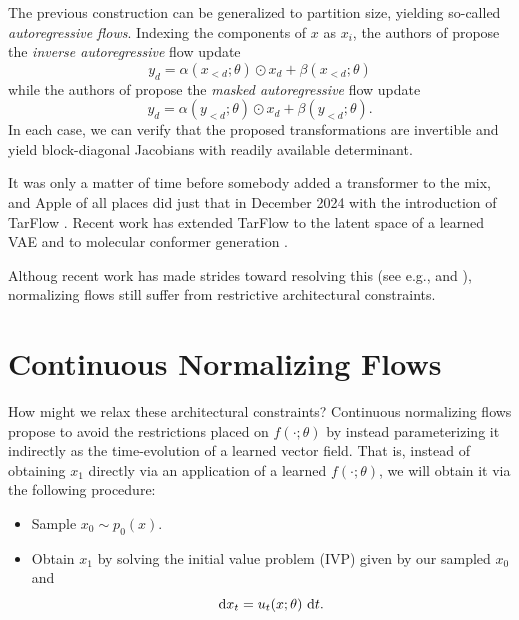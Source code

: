 \documentclass{scrartcl}
\begin{document}
\begin{examplebox}
    The previous construction can be generalized to partition size, yielding so-called \textit{autoregressive flows}. Indexing the components of $x$ as $x_i$, the authors of \citep{iaf}
    propose the \textit{inverse autoregressive} flow update
    \begin{equation}
    y_{d} = \alpha(x_{<d};\theta) \odot x_d + \beta(x_{<d}; \theta)
    \end{equation}
    while the authors of \citep{maf} propose the \textit{masked autoregressive} flow update
    \begin{equation}
    y_{d} = \alpha(y_{<d};\theta) \odot x_d + \beta(y_{<d}; \theta).
    \end{equation}
    In each case, we can verify that the proposed transformations are invertible and yield block-diagonal Jacobians with readily available determinant.
\end{examplebox}

\begin{examplebox}[TarFlow]
    It was only a matter of time before somebody added a transformer to the mix, and Apple of all places did just that in December 2024 with the introduction of TarFlow \citep{tarflow}. Recent work has extended TarFlow to the latent space of a learned VAE \citep{starflow} and to molecular conformer generation \citep{amortized_sampling}.
\end{examplebox}

Althoug recent work has made strides toward resolving this (see e.g., \citep{tarflow} and \citep{starflow}), normalizing flows still suffer from restrictive architectural constraints.

\section{Continuous Normalizing Flows}
How might we relax these architectural constraints? Continuous normalizing flows propose to avoid the restrictions placed on $f(\cdot; \theta)$ by instead parameterizing it indirectly as the time-evolution of a learned vector field. 
That is, instead of obtaining $x_1$ directly via an application of a learned $f(\cdot; \theta)$, we will obtain it via the following procedure:
\begin{itemize}
\item Sample $x_0 \sim p_0(x)$.
\item Obtain $x_1$ by solving the initial value problem (IVP) given by our sampled $x_0$ and \begin{equation}
\d x_t = u_t(x; \theta)\, \d t. \label{eq:cnf}
\end{equation}
\end{itemize}
\end{document}
